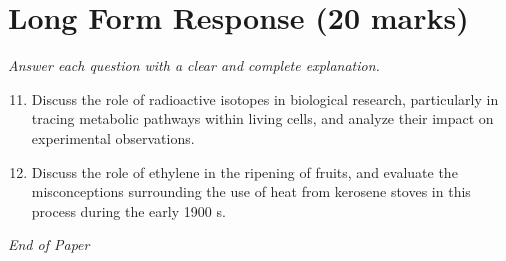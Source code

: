 \documentclass[12pt]{article}
\begin{document}
\section*{Long Form Response (20 marks)}
\textit{Answer each question with a clear and complete explanation.}
\begin{enumerate}[label=\arabic*.]
\setcounter{enumi}{10}
\item Discuss the role of radioactive isotopes in biological research, particularly in tracing metabolic pathways within living cells, and analyze their impact on experimental observations.
\item Discuss the role of ethylene in the ripening of fruits, and evaluate the misconceptions surrounding the use of heat from kerosene stoves in this process during the early 1900 s.
\end{enumerate}

\vfill
\noindent\textit{End of Paper}
\end{document}
